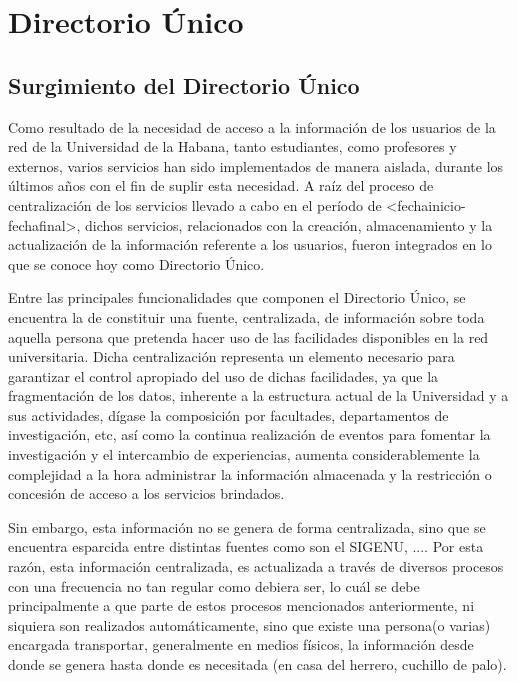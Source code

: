 \chapter{Directorio \'Unico}

\section{Surgimiento del Directorio \'Unico}

Como resultado de la necesidad de acceso a la informaci\'on de los usuarios de la red de la Universidad de la Habana, tanto estudiantes, como profesores y externos, varios servicios han sido implementados de manera aislada, durante los \'ultimos años con el fin de suplir esta necesidad. A ra\'iz del proceso de centralizaci\'on de los servicios llevado a cabo en el per\'iodo de <fechainicio-fechafinal>, dichos servicios, relacionados con la creaci\'on, almacenamiento y la actualizaci\'on de la informaci\'on referente a los usuarios, fueron integrados en lo que se conoce hoy como Directorio \'Unico.

Entre las principales funcionalidades que componen el Directorio \'Unico, se encuentra la de constituir una fuente, centralizada, de informaci\'on sobre toda aquella persona que pretenda hacer uso de las facilidades disponibles en la red universitaria. Dicha centralizaci\'on representa un elemento necesario para garantizar el control apropiado del uso de dichas facilidades, ya que la fragmentaci\'on de los datos, inherente a la estructura actual de la Universidad y a sus actividades, d\'igase la composici\'on por facultades, departamentos de investigaci\'on, etc, as\'i como la continua realizaci\'on de eventos para fomentar la investigaci\'on y el intercambio de experiencias, aumenta considerablemente la complejidad a la hora administrar la informaci\'on almacenada y la restricci\'on o concesi\'on de acceso a los servicios brindados. 

Sin embargo, esta informaci\'on no se genera de forma centralizada, sino que se encuentra esparcida entre distintas fuentes como son el SIGENU, ....  
Por esta raz\'on, esta informaci\'on centralizada, es actualizada a trav\'es de diversos procesos con una frecuencia no tan regular como debiera ser, lo cu\'al se debe principalmente a que parte de estos procesos mencionados anteriormente, ni siquiera son realizados autom\'aticamente, sino que existe una persona(o varias) encargada transportar, generalmente en medios f\'isicos, la informaci\'on desde donde se genera hasta donde es necesitada (en casa del herrero, cuchillo de palo).

